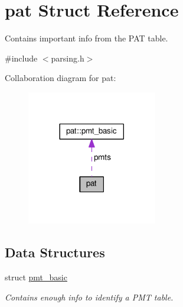 \hypertarget{structpat}{}\section{pat Struct Reference}
\label{structpat}


Contains important info from the P\+AT table.  




{\ttfamily \#include $<$parsing.\+h$>$}



Collaboration diagram for pat\+:\nopagebreak
\begin{figure}[H]
\begin{center}
\leavevmode
\includegraphics[width=161pt]{structpat__coll__graph}
\end{center}
\end{figure}
\subsection*{Data Structures}
\begin{DoxyCompactItemize}
\item 
struct \hyperlink{structpat_1_1pmt__basic}{pmt\+\_\+basic}
\begin{DoxyCompactList}\small\item\em Contains enough info to identify a P\+MT table. \end{DoxyCompactList}\end{DoxyCompactItemize}
